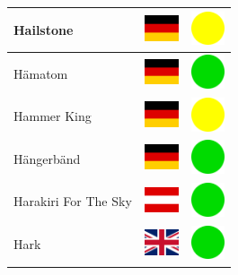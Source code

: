 \documentclass[12pt, a4paper, twoside]{report}
\begin{document}
\begin{center}
\begin{longtable}{|p{5cm}|p{2cm}|p{2cm}|}
Hailstone & \includegraphics[width=1cm]{4x3/de} & \includegraphics[width=1cm]{likes/m} \\ \hline
Hämatom & \includegraphics[width=1cm]{4x3/de} & \includegraphics[width=1cm]{likes/y} \\ \hline
Hammer King & \includegraphics[width=1cm]{4x3/de} & \includegraphics[width=1cm]{likes/m} \\ \hline
Hängerbänd & \includegraphics[width=1cm]{4x3/de} & \includegraphics[width=1cm]{likes/y} \\ \hline
Harakiri For The Sky & \includegraphics[width=1cm]{4x3/at} & \includegraphics[width=1cm]{likes/y} \\ \hline
Hark & \includegraphics[width=1cm]{4x3/gb} & \includegraphics[width=1cm]{likes/y} \\ \hline

\end{longtable}
\end{center}
\end{document}

